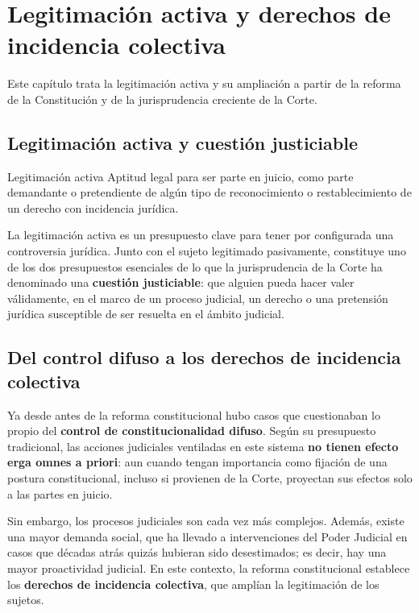 \documentclass[12pt,oneside]{book}
\begin{document}
\chapter[Legitimación e incidencia colectiva]{Legitimación activa y derechos de incidencia colectiva}

Este capítulo trata la legitimación activa y su ampliación a partir de la reforma de la Constitución y de la jurisprudencia creciente de la Corte.

\section{Legitimación activa y cuestión justiciable}

\begin{definition}{Legitimación activa}
Aptitud legal para ser parte en juicio, como parte demandante o pretendiente de algún tipo de reconocimiento o restablecimiento de un derecho con incidencia jurídica.
\end{definition}

La legitimación activa es un presupuesto clave para tener por configurada una controversia jurídica. Junto con el sujeto legitimado pasivamente, constituye uno de los dos presupuestos esenciales de lo que la jurisprudencia de la Corte ha denominado una \textbf{cuestión justiciable}: que alguien pueda hacer valer válidamente, en el marco de un proceso judicial, un derecho o una pretensión jurídica susceptible de ser resuelta en el ámbito judicial.

\section{Del control difuso a los derechos de incidencia colectiva}

Ya desde antes de la reforma constitucional hubo casos que cuestionaban lo propio del \textbf{control de constitucionalidad difuso}. Según su presupuesto tradicional, las acciones judiciales ventiladas en este sistema \textbf{no tienen efecto erga omnes a priori}: aun cuando tengan importancia como fijación de una postura constitucional, incluso si provienen de la Corte, proyectan sus efectos solo a las partes en juicio.

Sin embargo, los procesos judiciales son cada vez más complejos. Además, existe una mayor demanda social, que ha llevado a intervenciones del Poder Judicial en casos que décadas atrás quizás hubieran sido desestimados; es decir, hay una mayor proactividad judicial. En este contexto, la reforma constitucional establece los \textbf{derechos de incidencia colectiva}, que amplían la legitimación de los sujetos.
\end{document}
